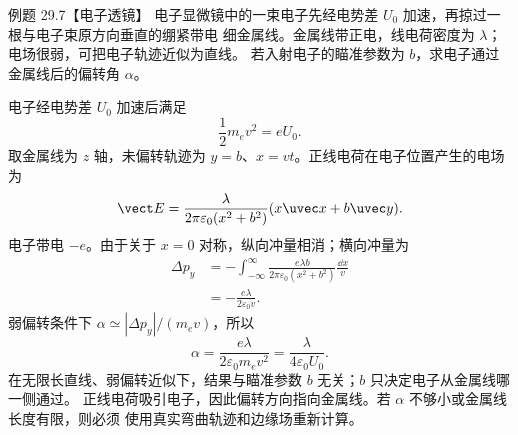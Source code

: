 \Needspace{0.35\textheight}
\begin{origexamplebox}{例题 29.7【电子透镜】}
电子显微镜中的一束电子先经电势差 $U_0$ 加速，再掠过一根与电子束原方向垂直的绷紧带电
细金属线。金属线带正电，线电荷密度为 $\lambda$；电场很弱，可把电子轨迹近似为直线。
若入射电子的瞄准参数为 $b$，求电子通过金属线后的偏转角 $\alpha$。
\electronLensDiagram
\end{origexamplebox}

\begin{xesolution}
电子经电势差 $U_0$ 加速后满足
\[
  \frac12m_ev^2=eU_0.
\]
取金属线为 $z$ 轴，未偏转轨迹为 $y=b$、$x=vt$。正线电荷在电子位置产生的电场为
\[
  \vect E=\frac{\lambda}{2\pi\varepsilon_0(x^2+b^2)}
  (x\uvec x+b\uvec y).
\]
电子带电 $-e$。由于关于 $x=0$ 对称，纵向冲量相消；横向冲量为
\begin{align*}
  \Delta p_y
  &=-\int_{-\infty}^{\infty}
  \frac{e\lambda b}{2\pi\varepsilon_0(x^2+b^2)}\frac{\dd x}{v}\\
  &=-\frac{e\lambda}{2\varepsilon_0v}.
\end{align*}
弱偏转条件下 $\alpha\simeq|\Delta p_y|/(m_ev)$，所以
\[
  \alpha=\frac{e\lambda}{2\varepsilon_0m_ev^2}
  =\boxed{\frac{\lambda}{4\varepsilon_0U_0}}.
\]
在无限长直线、弱偏转近似下，结果与瞄准参数 $b$ 无关；$b$ 只决定电子从金属线哪一侧通过。
正线电荷吸引电子，因此偏转方向指向金属线。若 $\alpha$ 不够小或金属线长度有限，则必须
使用真实弯曲轨迹和边缘场重新计算。
\end{xesolution}
